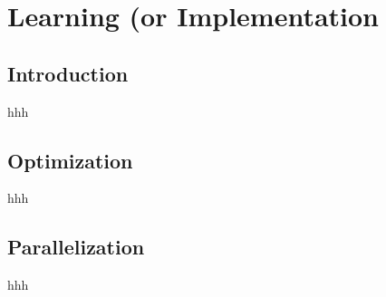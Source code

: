 \chapter{Learning (or Implementation}


\section{Introduction}

hhh

\section{Optimization}

hhh

\section{Parallelization}

hhh